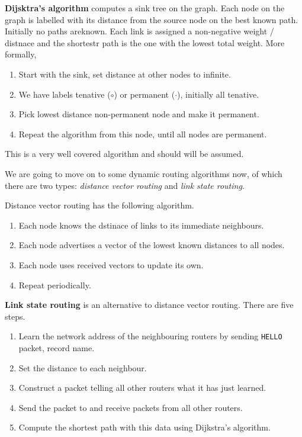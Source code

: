 \begin{algorithm}[Dijsktra's]
    \textbf{Dijsktra's algorithm} computes a sink tree on the graph. Each node on the graph is labelled with its distance from the source node on the best known path. Initially no paths areknown. Each link is assigned a non-negative weight / distnace and the shortestr path is the one with the lowest total weight. More formally,
    \begin{enumerate}
        \item Start with the sink, set distance at other nodes to infinite.
        \item We have labels tenative ($\circ$) or permanent ($\cdot$), initially all tenative.
        \item Pick lowest distance non-permanent node and make it permanent.
        \item Repeat the algorithm from this node, until all nodes are permanent.
    \end{enumerate}
\end{algorithm}

This is a very well covered algorithm and should will be assumed.

We are going to move on to some dynamic routing algorithms now, of which there are two types: \emph{distance vector routing} and \emph{link state routing}.

\begin{algorithm}
    Distance vector routing has the following algorithm.
    \begin{enumerate}
        \item Each node knows the dstinace of links to its immediate neighbours.
        \item Each node advertises a vector of the lowest known distances to all nodes.
        \item Each node uses received vectors to update its own.
        \item Repeat periodically.
    \end{enumerate}
\end{algorithm}


\begin{algorithm}
    \textbf{Link state routing} is an alternative to distance vector routing. There are five steps.
    \begin{enumerate}
        \item Learn the network address of the neighbouring routers by sending \texttt{HELLO} packet, record name.
        \item Set the distance to each neighbour.
        \item Construct a packet telling all other routers what it has just learned.
        \item Send the packet to and receive packets from all other routers.
        \item Compute the shortest path with this data using Dijkstra's algorithm.
    \end{enumerate}
\end{algorithm}

